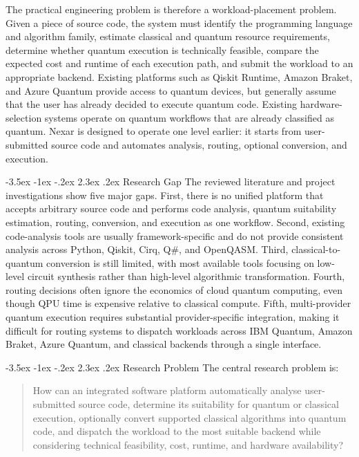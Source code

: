 \documentclass[12pt,a4paper]{report}
\makeatletter
\renewcommand\section{\@startsection{section}{1}{\z@}%
  {-3.5ex \@plus -1ex \@minus -.2ex}%
  {2.3ex \@plus.2ex}%
  {\normalfont\bfseries\fontsize{12pt}{16pt}\selectfont}}
\makeatother
\begin{document}
The practical engineering problem is therefore a workload-placement problem. Given a piece of source code, the system must identify the programming language and algorithm family, estimate classical and quantum resource requirements, determine whether quantum execution is technically feasible, compare the expected cost and runtime of each execution path, and submit the workload to an appropriate backend. Existing platforms such as Qiskit Runtime, Amazon Braket, and Azure Quantum provide access to quantum devices, but generally assume that the user has already decided to execute quantum code. Existing hardware-selection systems operate on quantum workflows that are already classified as quantum. Nexar is designed to operate one level earlier: it starts from user-submitted source code and automates analysis, routing, optional conversion, and execution.

\section{Research Gap}
The reviewed literature and project investigations show five major gaps. First, there is no unified platform that accepts arbitrary source code and performs code analysis, quantum suitability estimation, routing, conversion, and execution as one workflow. Second, existing code-analysis tools are usually framework-specific and do not provide consistent analysis across Python, Qiskit, Cirq, Q\#, and OpenQASM. Third, classical-to-quantum conversion is still limited, with most available tools focusing on low-level circuit synthesis rather than high-level algorithmic transformation. Fourth, routing decisions often ignore the economics of cloud quantum computing, even though QPU time is expensive relative to classical compute. Fifth, multi-provider quantum execution requires substantial provider-specific integration, making it difficult for routing systems to dispatch workloads across IBM Quantum, Amazon Braket, Azure Quantum, and classical backends through a single interface.

\section{Research Problem}
The central research problem is:

\begin{quote}
How can an integrated software platform automatically analyse user-submitted source code, determine its suitability for quantum or classical execution, optionally convert supported classical algorithms into quantum code, and dispatch the workload to the most suitable backend while considering technical feasibility, cost, runtime, and hardware availability?
\end{quote}
\end{document}
